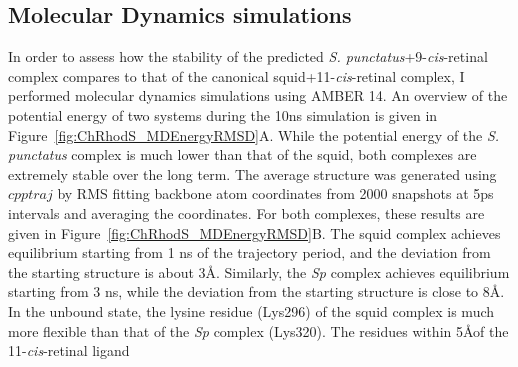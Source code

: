 \subsection*{Molecular Dynamics simulations}
In order to assess how the stability of the predicted \textit{S. punctatus}+9-\textit{cis}-retinal complex compares to that of the canonical squid+11-\textit{cis}-retinal complex, I performed molecular dynamics simulations using AMBER 14. An overview of the potential energy of two systems during the 10ns simulation is given in Figure~\ref{fig:ChRhodS_MDEnergyRMSD}A. While the potential energy of the \textit{S. punctatus} complex is much lower than that of the squid, both complexes are extremely stable over the long term. The average structure was generated using $cpptraj$ by RMS fitting backbone atom coordinates from 2000 snapshots at 5ps intervals and averaging the coordinates. For both complexes, these results are given in Figure~\ref{fig:ChRhodS_MDEnergyRMSD}B. The squid complex achieves equilibrium starting from 1 ns of the trajectory period, and the deviation from the starting structure is about 3\AA. Similarly, the \textit{Sp} complex achieves equilibrium starting from 3 ns, while the deviation from the starting structure is close to 8\AA. \\
\indent In the unbound state, the lysine residue (Lys296) of the squid complex is much more flexible than that of the \textit{Sp} complex (Lys320). The residues within 5\AA of the 11-\textit{cis}-retinal ligand 

